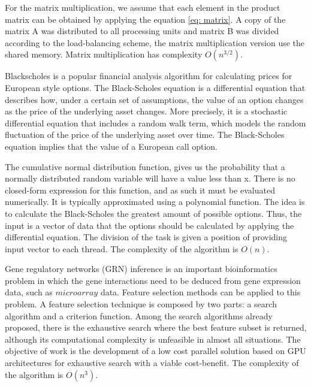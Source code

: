 \documentclass[journal]{IEEEtran}
\begin{document}
For the matrix multiplication, we assume that each element in the product matrix
can be obtained by applying the equation \ref{eq: matrix}. A copy of the matrix
A was distributed to all processing units and matrix B was divided according to
the load-balancing scheme, the matrix multiplication version use the shared memory. Matrix multiplication has complexity $O(n^{3/2})$.

Blackscholes is a popular financial analysis algorithm for calculating prices
for European style options. The Black-Scholes equation is a differential
equation that describes how, under a certain set of assumptions, the value of an
option changes as the price of the underlying asset changes. More precisely, it
is a stochastic differential equation that includes a random walk term, which
models the random fluctuation of the price of the underlying asset over time.
The Black-Scholes equation implies that the value of a European call option.


The cumulative normal distribution function, gives us the probability that a
normally distributed random variable will have a value less than x. There is no
closed-form expression for this function, and as such it must be evaluated
numerically. It is typically approximated using a polynomial function. The idea is to calculate the Black-Scholes the greatest amount of possible options. Thus, the input is a vector of data that the options should be calculated by applying the differential equation. The division of the task is given a position of providing input vector to each thread. The complexity of the algorithm is $O(n)$.


Gene regulatory networks (GRN) inference is an important bioinformatics problem in which the gene interactions need to be deduced from gene expression data, such as $microarray$ data. Feature selection methods can be applied to this problem. A feature selection technique is composed by two parts: a search algorithm and a criterion function. Among the search algorithms already proposed, there is the exhaustive search where the best
feature subset is returned, although its computational complexity is unfeasible in almost all situations. The objective of work is the development of a low cost parallel solution based on GPU architectures for exhaustive search with a viable cost-benefit. The complexity of the algorithm is $O(n^3)$.



\end{document}
